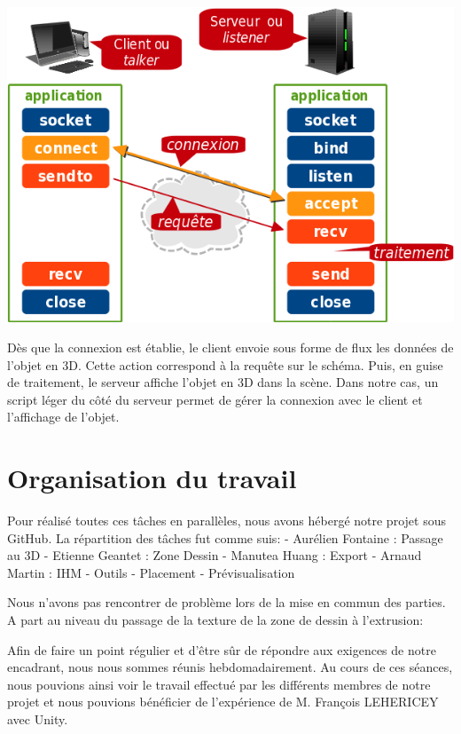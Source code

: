 \documentclass[a4paper,11pt]{article}
\begin{document}
			
			\centerline{\includegraphics[scale=1]{images/tcp-socket.png}}
			
			Dès que la connexion est établie, le client envoie sous forme de flux les données de l'objet en 3D. Cette action correspond à la requête sur le schéma. Puis, en guise de traitement, le serveur affiche l'objet en 3D dans la scène.
			Dans notre cas, un script léger du côté du serveur permet de gérer la connexion avec le client et l'affichage de l'objet.
			
	\section{Organisation du travail}
				
				Pour réalisé toutes ces tâches en parallèles, nous avons hébergé notre projet sous GitHub. La répartition des tâches fut comme suis:
				- Aurélien Fontaine : Passage au 3D
				- Etienne Geantet : Zone Dessin
				- Manutea Huang : Export
				- Arnaud Martin : IHM - Outils - Placement - Prévisualisation
			
				Nous n'avons pas rencontrer de problème lors de la mise en commun des parties. A part au niveau du passage de la texture de la zone de dessin à l'extrusion:
			
				Afin de faire un point régulier et d'être sûr de répondre aux exigences de notre encadrant, nous nous sommes réunis hebdomadairement. Au cours de ces séances, nous pouvions ainsi voir le travail effectué par les différents membres de notre projet et nous pouvions bénéficier de l'expérience de M. François LEHERICEY avec Unity.
				
\end{document}
